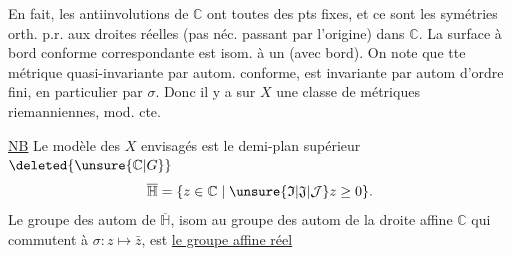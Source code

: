
En fait, les antiinvolutions de $\mathbb C$ ont toutes des pts fixes, et ce sont les symétries orth. p.r. aux droites réelles (pas néc. passant par l'origine) dans $\mathbb C$. La surface à bord conforme correspondante est isom. à un  (avec bord). On note que tte métrique  quasi-invariante par autom. conforme, est invariante par autom d'ordre fini, en particulier par $\sigma$. Donc il y a sur $X$ une classe  de métriques riemanniennes, mod. cte.

\uline{NB}  Le modèle des $X$ envisagés est le demi-plan supérieur $\deleted{\unsure{\mathbb C|G}}$
\[
\overline{\mathbb H}=\{z\in\mathbb C\mid\unsure{\mathfrak I|\mathfrak J|\mathcal J}z\geq0\}.
\]
Le groupe des autom de $\overline{\mathbb H}$, isom au groupe des autom de la droite affine $\mathbb C$ qui commutent à $\sigma:z\longmapsto\bar z$, est \uline{le groupe affine réel}
